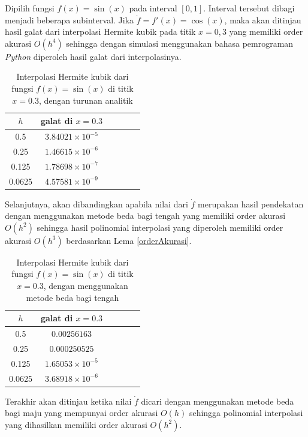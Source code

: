 \begin{contoh}
Dipilih fungsi $f(x) = \sin(x)$ pada interval $[0,1]$. Interval tersebut dibagi menjadi beberapa subinterval. Jika $\dot{f} = f'(x)=\cos(x)$, maka akan ditinjau hasil galat dari interpolasi Hermite kubik pada titik $x=0,3$ yang memiliki order akurasi $O(h^4)$ sehingga dengan simulasi menggunakan bahasa pemrograman \textit{Python} diperoleh hasil galat dari interpolasinya.

\begin{table}[htp]
        \centering
        \begin{tabular}{|c|c|c|c|c|c|}
    \hline $h$& galat di $x = 0.3$ \\ 
    \hline
0.5&$3.84021 \times 10^{-5}$  \\
0.25&$1.46615 \times 10^{-6}$ \\
0.125&$1.78698 \times 10^{-7}$  \\
0.0625&$4.57581 \times 10^{-9}$  \\
    \hline
    \end{tabular}
        \caption{Interpolasi Hermite kubik dari fungsi $f(x)=\sin(x)$ di titik $x=0.3$, dengan turunan analitik}
        \label{contohOrderAkurasi1}
\end{table}
    
Selanjutnya, akan dibandingkan apabila nilai dari $\dot{f}$ merupakan hasil pendekatan dengan menggunakan metode beda bagi tengah yang memiliki order akurasi $O(h^2)$ sehingga hasil polinomial interpolasi yang diperoleh memiliki order akurasi $O(h^3)$ berdasarkan Lema \ref{orderAkurasi}.
\begin{table}[htp]
        \centering
        \begin{tabular}{|c|c|c|c|c|c|}
    \hline $h$& galat di $x = 0.3$ \\ 
    \hline
0.5&$0.00256163$  \\
0.25&$0.000250525 $ \\
0.125&$1.65053 \times 10^{-5}$  \\
0.0625&$3.68918 \times 10^{-6}$  \\
    \hline
    \end{tabular}
        \caption{Interpolasi Hermite kubik dari fungsi $f(x)=\sin(x)$ di titik $x=0.3$, dengan menggunakan metode beda bagi tengah}
        \label{contohOrderAkurasi2}
\end{table}
Terakhir akan ditinjau ketika nilai $\dot{f}$ dicari dengan menggunakan metode beda bagi maju yang mempunyai order akurasi $O(h)$ sehingga polinomial interpolasi yang dihasilkan memiliki order akurasi $O(h^2)$.


\end{contoh}

